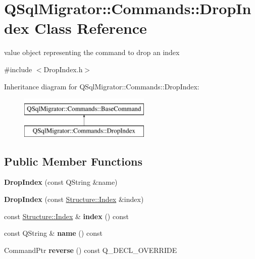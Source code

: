 \hypertarget{class_q_sql_migrator_1_1_commands_1_1_drop_index}{}\section{Q\+Sql\+Migrator\+:\+:Commands\+:\+:Drop\+Index Class Reference}
\label{class_q_sql_migrator_1_1_commands_1_1_drop_index}


value object representing the command to drop an index  




{\ttfamily \#include $<$Drop\+Index.\+h$>$}

Inheritance diagram for Q\+Sql\+Migrator\+:\+:Commands\+:\+:Drop\+Index\+:\begin{figure}[H]
\begin{center}
\leavevmode
\includegraphics[height=2.000000cm]{class_q_sql_migrator_1_1_commands_1_1_drop_index}
\end{center}
\end{figure}
\subsection*{Public Member Functions}
\begin{DoxyCompactItemize}
\item 
\mbox{\label{class_q_sql_migrator_1_1_commands_1_1_drop_index_a76c4467f46ad442751cfe80e07ef37eb}} 
{\bfseries Drop\+Index} (const Q\+String \&name)
\item 
\mbox{\label{class_q_sql_migrator_1_1_commands_1_1_drop_index_a916fb44757c2e8ae465b180508327cfc}} 
{\bfseries Drop\+Index} (const \hyperlink{class_q_sql_migrator_1_1_structure_1_1_index}{Structure\+::\+Index} \&index)
\item 
\mbox{\label{class_q_sql_migrator_1_1_commands_1_1_drop_index_a503215d44baf099fd8fc59e607ae8a53}} 
const \hyperlink{class_q_sql_migrator_1_1_structure_1_1_index}{Structure\+::\+Index} \& {\bfseries index} () const
\item 
\mbox{\label{class_q_sql_migrator_1_1_commands_1_1_drop_index_aa9c9ca93e97251de0a779e4b15ce1d23}} 
const Q\+String \& {\bfseries name} () const
\item 
\mbox{\label{class_q_sql_migrator_1_1_commands_1_1_drop_index_a90fa2bbaba6ef98eafa87417d7243dfe}} 
Command\+Ptr {\bfseries reverse} () const Q\+\_\+\+D\+E\+C\+L\+\_\+\+O\+V\+E\+R\+R\+I\+DE
\end{DoxyCompactItemize}
